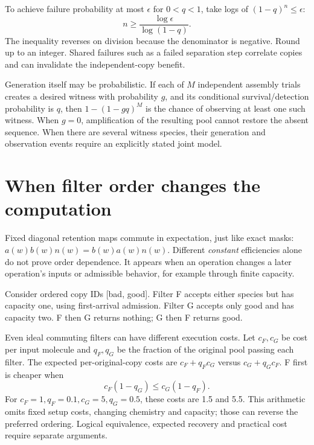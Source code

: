 To achieve failure probability at most $\epsilon$ for $0<q<1$,
take logs of $(1-q)^n\le\epsilon$:
\begin{equation}
 n\ge \frac{\log\epsilon}{\log(1-q)}.
\end{equation}
The inequality reverses on division because the denominator is negative.
Round up to an integer. Shared failures such as a failed separation step
correlate copies and can invalidate the independent-copy benefit.

Generation itself may be probabilistic. If each of $M$ independent assembly
trials creates a desired witness with probability $g$, and its conditional
survival/detection probability is $q$, then
$1-(1-gq)^M$ is the chance of observing at least one such witness.
When $g=0$, amplification of the resulting pool cannot restore the absent
sequence. When there are several witness species, their generation and
observation events require an explicitly stated joint model.

\section{When filter order changes the computation}
Fixed diagonal retention maps commute in expectation, just like exact masks:
$a(w)b(w)n(w)=b(w)a(w)n(w)$. Different \emph{constant} efficiencies alone
do not prove order dependence. It appears when an operation changes a later
operation's inputs or admissible behavior, for example through finite capacity.

Consider ordered copy IDs [bad, good]. Filter F accepts either species but
has capacity one, using first-arrival admission. Filter G accepts only good
and has capacity two. F then G returns nothing; G then F returns good.

Even ideal commuting filters can have different execution costs. Let
$c_F,c_G$ be cost per input molecule and $q_F,q_G$ be the fraction of the
original pool passing each filter. The expected per-original-copy costs are
$c_F+q_Fc_G$ versus $c_G+q_Gc_F$. F first is cheaper when
\begin{equation}
 c_F(1-q_G)\le c_G(1-q_F).
\end{equation}
For $c_F=1,q_F=0.1,c_G=5,q_G=0.5$, these costs are 1.5 and 5.5.
This arithmetic omits fixed setup costs, changing chemistry and capacity;
those can reverse the preferred ordering. Logical equivalence, expected
recovery and practical cost require separate arguments.

